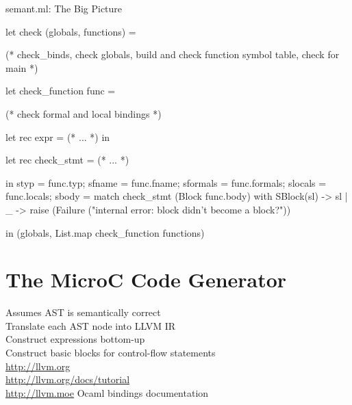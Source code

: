 \documentclass{plt}
\begin{document}
\begin{frame}[fragile=singleslide]{semant.ml: The Big Picture}

\begin{ocaml}
let check (globals, functions) =
  
  (* check_binds, check globals,
     build and check function symbol table, check for main *)

  let check_function func =

    (* check formal and local bindings *)

    let rec expr = (* ... *) in
  
    let rec check_stmt = (* ... *)

  in { styp     = func.typ;
       sfname   = func.fname;
       sformals = func.formals;
       slocals  = func.locals;
       sbody    = match check_stmt (Block func.body) with 
 	 SBlock(sl) -> sl
       | _ -> raise (Failure
               ("internal error: block didn't become a block?"))
  }
  
in (globals, List.map check_function functions)
\end{ocaml}

\end{frame}



\part{The MicroC Code Generator}

\begin{frame}
\partpage

\begin{center}
\large
Assumes AST is semantically correct \\
Translate each AST node into LLVM IR \\
Construct expressions bottom-up \\
Construct basic blocks for control-flow statements \\
\medskip
\url{http://llvm.org} \\
\url{http://llvm.org/docs/tutorial} \\
\medskip
\url{http://llvm.moe} Ocaml bindings documentation
\end{center}

\end{frame}
\end{document}
